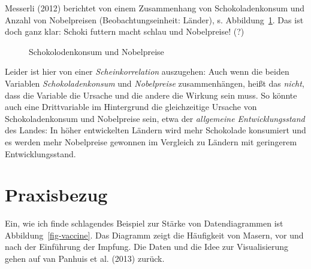 \documentclass[
  letterpaper,
]{scrbook}
\theoremstyle{definition}
\theoremstyle{definition}
\theoremstyle{definition}
\theoremstyle{remark}
\begin{document}
Messerli (2012) berichtet von einem Zusammenhang von Schokoladenkonsum
und Anzahl von Nobelpreisen (Beobachtungseinheit: Länder), s.
Abbildung~\ref{fig-choc}. Das ist doch ganz klar: Schoki futtern macht
schlau und Nobelpreise! (?)

\begin{figure}


\caption{\label{fig-choc}Schokolodenkonsum und Nobelpreise}

\end{figure}%

Leider ist hier von einer \emph{Scheinkorrelation} auszugehen: Auch wenn
die beiden Variablen \emph{Schokoladenkonsum} und \emph{Nobelpreise}
zusammenhängen, heißt das \emph{nicht}, dass die Variable die Ursache
und die andere die Wirkung sein muss. So könnte auch eine Drittvariable
im Hintergrund die gleichzeitige Ursache von Schokoladenkonsum und
Nobelpreise sein, etwa der \emph{allgemeine Entwicklungsstand} des
Landes: In höher entwickelten Ländern wird mehr Schokolade konsumiert
und es werden mehr Nobelpreise gewonnen im Vergleich zu Ländern mit
geringerem Entwicklungsstand.

\section{Praxisbezug}\label{praxisbezug-3}

Ein, wie ich finde schlagendes Beispiel zur Stärke von Datendiagrammen
ist Abbildung~\ref{fig-vaccine}. Das Diagramm zeigt die Häufigkeit von
Masern, vor und nach der Einführung der Impfung. Die Daten und die Idee
zur Visualisierung gehen auf van Panhuis et al. (2013) zurück.
\end{document}
